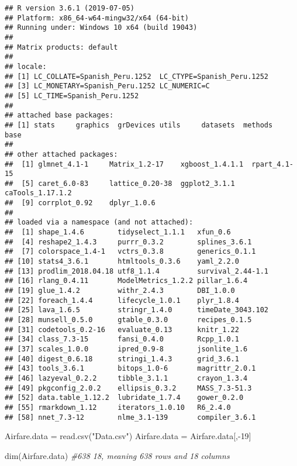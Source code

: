 \documentclass[]{article}
\newenvironment{Shaded}{\begin{snugshade}}{\end{snugshade}}
\newcommand{\CommentTok}[1]{\textcolor[rgb]{0.56,0.35,0.01}{\textit{#1}}}
\newcommand{\DecValTok}[1]{\textcolor[rgb]{0.00,0.00,0.81}{#1}}
\newcommand{\FunctionTok}[1]{\textcolor[rgb]{0.00,0.00,0.00}{#1}}
\newcommand{\NormalTok}[1]{#1}
\newcommand{\OtherTok}[1]{\textcolor[rgb]{0.56,0.35,0.01}{#1}}
\newcommand{\SpecialCharTok}[1]{\textcolor[rgb]{0.00,0.00,0.00}{#1}}
\newcommand{\StringTok}[1]{\textcolor[rgb]{0.31,0.60,0.02}{#1}}
\begin{document}
\begin{verbatim}
## R version 3.6.1 (2019-07-05)
## Platform: x86_64-w64-mingw32/x64 (64-bit)
## Running under: Windows 10 x64 (build 19043)
## 
## Matrix products: default
## 
## locale:
## [1] LC_COLLATE=Spanish_Peru.1252  LC_CTYPE=Spanish_Peru.1252   
## [3] LC_MONETARY=Spanish_Peru.1252 LC_NUMERIC=C                 
## [5] LC_TIME=Spanish_Peru.1252    
## 
## attached base packages:
## [1] stats     graphics  grDevices utils     datasets  methods   base     
## 
## other attached packages:
##  [1] glmnet_4.1-1     Matrix_1.2-17    xgboost_1.4.1.1  rpart_4.1-15    
##  [5] caret_6.0-83     lattice_0.20-38  ggplot2_3.1.1    caTools_1.17.1.2
##  [9] corrplot_0.92    dplyr_1.0.6     
## 
## loaded via a namespace (and not attached):
##  [1] shape_1.4.6        tidyselect_1.1.1   xfun_0.6          
##  [4] reshape2_1.4.3     purrr_0.3.2        splines_3.6.1     
##  [7] colorspace_1.4-1   vctrs_0.3.8        generics_0.1.1    
## [10] stats4_3.6.1       htmltools_0.3.6    yaml_2.2.0        
## [13] prodlim_2018.04.18 utf8_1.1.4         survival_2.44-1.1 
## [16] rlang_0.4.11       ModelMetrics_1.2.2 pillar_1.6.4      
## [19] glue_1.4.2         withr_2.4.3        DBI_1.0.0         
## [22] foreach_1.4.4      lifecycle_1.0.1    plyr_1.8.4        
## [25] lava_1.6.5         stringr_1.4.0      timeDate_3043.102 
## [28] munsell_0.5.0      gtable_0.3.0       recipes_0.1.5     
## [31] codetools_0.2-16   evaluate_0.13      knitr_1.22        
## [34] class_7.3-15       fansi_0.4.0        Rcpp_1.0.1        
## [37] scales_1.0.0       ipred_0.9-8        jsonlite_1.6      
## [40] digest_0.6.18      stringi_1.4.3      grid_3.6.1        
## [43] tools_3.6.1        bitops_1.0-6       magrittr_2.0.1    
## [46] lazyeval_0.2.2     tibble_3.1.1       crayon_1.3.4      
## [49] pkgconfig_2.0.2    ellipsis_0.3.2     MASS_7.3-51.3     
## [52] data.table_1.12.2  lubridate_1.7.4    gower_0.2.0       
## [55] rmarkdown_1.12     iterators_1.0.10   R6_2.4.0          
## [58] nnet_7.3-12        nlme_3.1-139       compiler_3.6.1
\end{verbatim}

\begin{Shaded}
\begin{Highlighting}[]
\NormalTok{Airfare.data }\OtherTok{=}  \FunctionTok{read.csv}\NormalTok{(}\StringTok{"Data.csv"}\NormalTok{)}
\NormalTok{Airfare.data }\OtherTok{=}\NormalTok{ Airfare.data[,}\SpecialCharTok{{-}}\DecValTok{19}\NormalTok{]}


\FunctionTok{dim}\NormalTok{(Airfare.data)  }\CommentTok{\#638  18, meaning 638 rows and 18 columns}
\end{Highlighting}
\end{Shaded}
\end{document}
